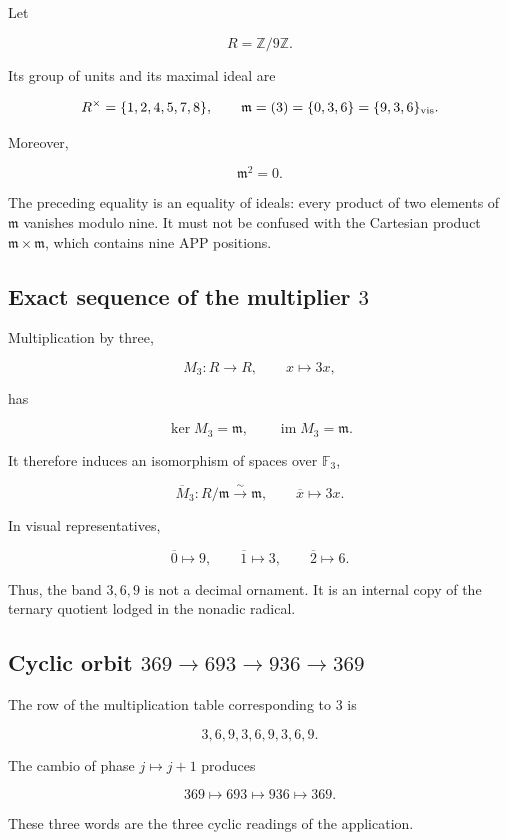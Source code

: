 Let

\[
R=\mathbb Z/9\mathbb Z.
\]

Its group of units and its maximal ideal are

\[
R^\times=\{1,2,4,5,7,8\},
\qquad
\mathfrak m=(3)=\{0,3,6\}=\{9,3,6\}_{\rm vis}.
\]

Moreover,

\[
\mathfrak m^2=0.
\]

The preceding equality is an equality of ideals: every product of two elements of \(\mathfrak m\) vanishes modulo nine. It must not be confused with the Cartesian product \(\mathfrak m\times\mathfrak m\), which contains nine APP positions.

\subsection{Exact sequence of the multiplier \(3\)}

Multiplication by three,

\[
M_3:R\longrightarrow R,
\qquad x\longmapsto3x,
\]

has

\[
\ker M_3=\mathfrak m,
\qquad
\operatorname{im}M_3=\mathfrak m.
\]

It therefore induces an isomorphism of spaces over \(\mathbb F_3\),

\[
\overline M_3:R/\mathfrak m\xrightarrow{\sim}\mathfrak m,
\qquad
\overline x\longmapsto3x.
\]

In visual representatives,

\[
\overline0\longmapsto9,
\qquad
\overline1\longmapsto3,
\qquad
\overline2\longmapsto6.
\]

Thus, the band \(3,6,9\) is not a decimal ornament. It is an internal copy of the ternary quotient lodged in the nonadic radical.

\subsection{Cyclic orbit \(369\to693\to936\to369\)}

The row of the multiplication table corresponding to \(3\) is

\[
3,6,9,3,6,9,3,6,9.
\]

The cambio of phase \(j\mapsto j+1\) produces

\[
369\longmapsto693\longmapsto936\longmapsto369.
\]

These three words are the three cyclic readings of the application.


